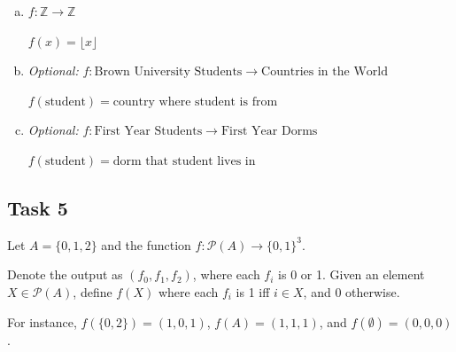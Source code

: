 \documentclass[12pt,letterpaper]{article}
\newcommand\N{\mathbb N}
\newcommand\Z{\mathbb Z}
\newif\ifsol
\newcommand{\solu}[2]{ \begin{mdframed} \ifsol #2 \else \vspace{#1} \fi \end{mdframed} }
\newcommand{\solm}[1]{\ifsol \textit{(#1)} \fi}
\begin{document}
\begin{enumerate}[a.]
        \solu{1cm}{Surjective, but not injective.}
 
        \item $f: \Z \rightarrow \Z$
        
        $f(x) = \lfloor x \rfloor$

        \solu{1cm}{Injective and surjective. Therefore bijective.}




        


        \item \textit{Optional:} $f : \text{Brown University Students} \rightarrow \text{Countries in the World}$

        $f(\text{student}) = \text{country where student is from}$

		\solu{1cm}{Not injective, and sadly not surjective.}
		
        \item \textit{Optional:} $f : \text{First Year Students} \rightarrow \text{First Year Dorms}$ 

        $f(\text{student}) = \text{dorm that student lives in}$

        \solu{1cm}{Not injective. Presumably surjective.}

      \end{enumerate}
      
\subsection*{Task 5}

Let $A=\{0,1,2\}$ and the function $f:{\mathcal P}(A)\rightarrow \{0,1\}^3$.

Denote the output as $(f_0, f_1, f_2)$, where each $f_i$ is 0 or 1. Given an element $X \in \mathcal{P}(A)$, define $f(X)$ where each $f_i$ is 1 iff $i\in X$, and 0 otherwise.
 
 For instance, $f(\{0, 2\}) = (1, 0, 1)$, $f(A) = (1, 1, 1)$, and $f(\emptyset) = (0, 0, 0)$.
 
\end{document}
